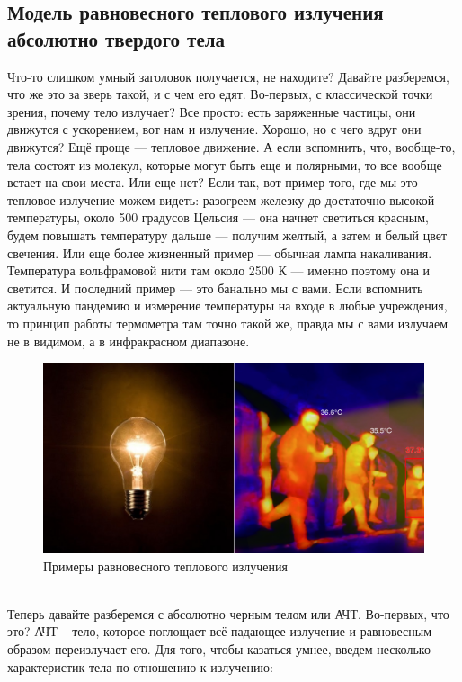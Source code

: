 \documentclass[12pt]{article}
\begin{document}
\subsection{Модель равновесного теплового излучения абсолютно твердого тела}
Что-то слишком умный заголовок получается, не находите? Давайте разберемся, что же это за зверь такой, и с чем его едят. Во-первых, с классической точки зрения, почему тело излучает? Все просто: есть заряженные частицы, они движутся с ускорением, вот нам и излучение. Хорошо, но с чего вдруг они движутся? Ещё проще  --- тепловое движение. А если вспомнить, что, вообще-то, тела состоят из молекул, которые могут быть еще и полярными, то все вообще встает на свои места. Или еще нет? Если так, вот пример того, где мы это тепловое излучение можем видеть: разогреем железку до достаточно высокой температуры, около 500 градусов Цельсия --- она начнет светиться красным, будем повышать температуру дальше --- получим желтый, а затем и белый цвет свечения. Или еще более жизненный пример --- обычная лампа накаливания. Температура вольфрамовой нити там около 2500 К --- именно поэтому она и светится. И последний пример --- это банально мы с вами. Если вспомнить актуальную пандемию и измерение температуры на входе в любые учреждения, то принцип работы термометра там точно такой же, правда мы с вами излучаем не в видимом, а в инфракрасном диапазоне.
\begin{figure}[h]
    \centering
    \includegraphics[width=\textwidth,height=\textheight,keepaspectratio]{Seminar_01/pics/pic_01.png}
    \caption{Примеры равновесного теплового излучения}
    \label{fig:sem_01_radiation_examples}
\end{figure}
\\
Теперь давайте разберемся с абсолютно черным телом или АЧТ. Во-первых, что это? АЧТ -- тело, которое поглощает всё падающее излучение и равновесным образом переизлучает его. Для того, чтобы казаться умнее, введем несколько характеристик тела по отношению к излучению: 
\end{document}
